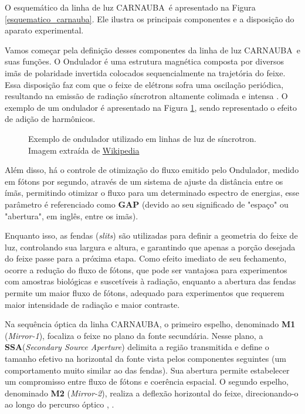 \documentclass[12pt,a4paper]{article}
\newcommand{\CNB}{CARNAUBA}
\begin{document}
O esquemático da linha de luz \CNB\ é apresentado na Figura \ref{esquematico_carnauba}. Ele ilustra os principais componentes e a disposição do aparato experimental.

Vamos começar pela definição desses componentes da linha de luz \CNB\ e suas funções. 
O Ondulador é uma estrutura magnética composta por diversos imãs de polaridade invertida colocados sequencialmente na trajetória do feixe.
Essa disposição faz com que o feixe de elétrons sofra uma oscilação periódica, resultando na emissão de radiação síncrotron altamente colimada e intensa \cite{esrf_1}. O exemplo de um ondulador é apresentado na Figura \ref{ondulador}, sendo representado o efeito de adição de harmônicos.

\begin{figure}[h]
    \centering
        
    \caption{Exemplo de ondulador utilizado em linhas de luz de síncrotron. Imagem extraída de \href{https://upload.wikimedia.org/wikipedia/commons/f/f3/Undulator.svg?utm_source=en.wikipedia.org&utm_campaign=index&utm_content=original}{Wikipedia}}
    \label{ondulador}
\end{figure}

Além disso, há o controle de otimização do fluxo emitido pelo Ondulador, medido em fótons por segundo, através de um sistema de ajuste da distância entre os ímãs, permitindo otimizar o fluxo para um determinado espectro de energias, esse parâmetro é referenciado como \textbf{GAP} (devido ao seu significado de "espaço" ou "abertura", em inglês, entre os imãs).

Enquanto isso, as fendas (\textit{slits}) são utilizadas para definir a geometria do feixe de luz, controlando sua largura e altura, e garantindo que apenas a porção desejada do feixe passe para a próxima etapa.
Como efeito imediato de seu fechamento, ocorre a redução do fluxo de fótons, que pode ser vantajosa para experimentos com amostras biológicas e suscetíveis à radiação, enquanto a abertura das fendas permite um maior fluxo de fótons, adequado para experimentos que requerem maior intensidade de radiação e maior contraste.

Na sequência óptica da linha \CNB, o primeiro espelho, denominado \textbf{M1} (\textit{Mirror-1}), focaliza o feixe no plano da fonte secundária. Nesse plano, a \textbf{SSA}(\textit{Secondary Source Aperture}) delimita a região transmitida e define o tamanho efetivo na horizontal da fonte vista pelos componentes seguintes (um comportamento muito similar ao das fendas). Sua abertura permite estabelecer um compromisso entre fluxo de fótons e coerência espacial. O segundo espelho, denominado \textbf{M2} (\textit{Mirror-2}), realiza a deflexão horizontal do feixe, direcionando-o ao longo do percurso óptico \cite{lnlscarnaubaoptica}, \cite{nanomax2021}.
\end{document}
